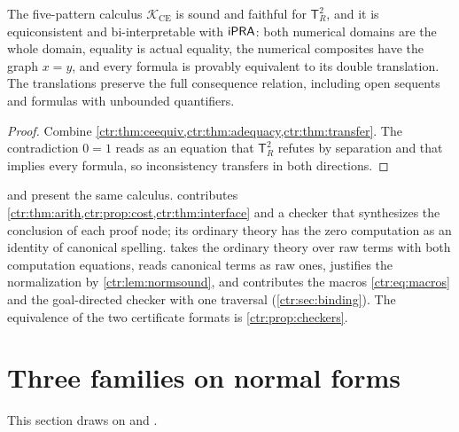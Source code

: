 \begin{theorem}\label{ctr:thm:cemain}
The five-pattern calculus $\mathcal K_{\mathrm{CE}}$ is sound and faithful for
$\mathsf T_R^2$, and it is equiconsistent and bi-interpretable with $\mathsf{iPRA}$: both numerical
domains are the whole domain, equality is actual equality, the numerical composites have the
graph $x=y$, and every formula is provably equivalent to its double translation. The
translations preserve the full consequence relation, including open sequents and formulas
with unbounded quantifiers.
\end{theorem}
\begin{proof}
Combine \cref{ctr:thm:ceequiv,ctr:thm:adequacy,ctr:thm:transfer}. The contradiction
$0=1$ reads as an equation that $\mathsf T_R^2$ refutes by separation and that implies every
formula, so inconsistency transfers in both directions.
\end{proof}

\begin{remark}
 and  present the same calculus.
 contributes \cref{ctr:thm:arith,ctr:prop:cost,ctr:thm:interface}
and a checker that synthesizes the conclusion of each proof node; its ordinary theory has
the zero computation as an identity of canonical spelling.  takes the
ordinary theory over raw terms with both computation equations, reads canonical terms as
raw ones, justifies the normalization by \cref{ctr:lem:normsound}, and contributes the
macros \eqref{ctr:eq:macros} and the goal-directed checker with one traversal
(\cref{ctr:sec:binding}). The equivalence of the two certificate formats is
\cref{ctr:prop:checkers}.
\end{remark}

\section{Three families on normal forms}\label{ctr:sec:three}

This section draws on  and .

